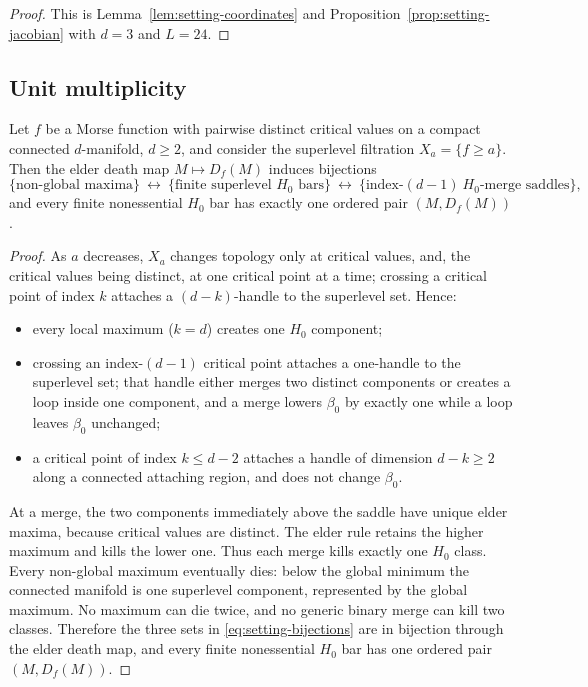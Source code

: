\begin{proof}
This is Lemma~\ref{lem:setting-coordinates} and Proposition~\ref{prop:setting-jacobian} with $d=3$ and $L=24$.
\end{proof}

\subsection{Unit multiplicity}\label{ssec:setting-multiplicity}

\begin{proposition}\label{prop:setting-multiplicity}
Let $f$ be a Morse function with pairwise distinct critical values on a compact connected $d$-manifold, $d\ge2$, and consider the superlevel filtration $X_a=\{f\ge a\}$. Then the elder death map $M\mapsto D_f(M)$ induces bijections
\begin{equation}\label{eq:setting-bijections}
\{\text{non-global maxima}\}\ \longleftrightarrow\ \{\text{finite superlevel }H_0\text{ bars}\}\ \longleftrightarrow\ \{\text{index-}(d-1)\ H_0\text{-merge saddles}\},
\end{equation}
and every finite nonessential $H_0$ bar has exactly one ordered pair $(M,D_f(M))$.
\end{proposition}

\begin{proof}
As $a$ decreases, $X_a$ changes topology only at critical values, and, the critical values being distinct, at one critical point at a time; crossing a critical point of index $k$ attaches a $(d-k)$-handle to the superlevel set. Hence:
\begin{itemize}[leftmargin=1.5em]
\item every local maximum ($k=d$) creates one $H_0$ component;
\item crossing an index-$(d-1)$ critical point attaches a one-handle to the superlevel set; that handle either merges two distinct components or creates a loop inside one component, and a merge lowers $\beta_0$ by exactly one while a loop leaves $\beta_0$ unchanged;
\item a critical point of index $k\le d-2$ attaches a handle of dimension $d-k\ge2$ along a connected attaching region, and does not change $\beta_0$.
\end{itemize}
At a merge, the two components immediately above the saddle have unique elder maxima, because critical values are distinct. The elder rule retains the higher maximum and kills the lower one. Thus each merge kills exactly one $H_0$ class. Every non-global maximum eventually dies: below the global minimum the connected manifold is one superlevel component, represented by the global maximum. No maximum can die twice, and no generic binary merge can kill two classes. Therefore the three sets in \eqref{eq:setting-bijections} are in bijection through the elder death map, and every finite nonessential $H_0$ bar has one ordered pair $(M,D_f(M))$.
\end{proof}

